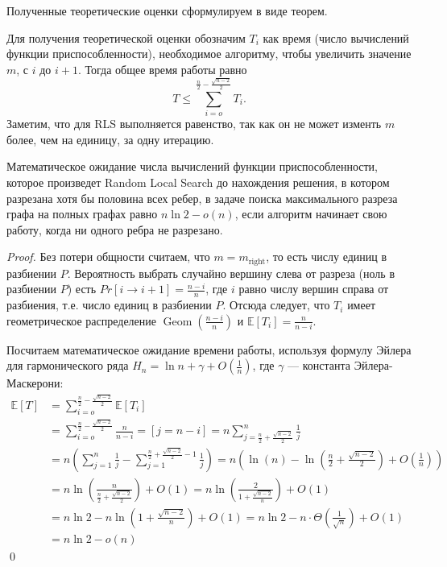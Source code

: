 \documentclass[times]{itmo-student-thesis}
\DeclareMathOperator{\Geom}{Geom}
\begin{document}
Полученные теоретические оценки сформулируем в виде теорем.


Для получения теоретической оценки обозначим $T_i$ как время (число вычислений функции приспособленности), необходимое алгоритму, чтобы увеличить значение $m$, с $i$ до $i + 1$.
Тогда общее время работы равно
$$
  T \le \sum_{i=o}^{\frac{n}{2} - \frac{\sqrt{n-2}}{2}} T_i.
$$
Заметим, что для RLS выполняется равенство, так как он не может изменть $m$ более, чем на единицу, за одну итерацию.

\begin{theorem} \label{thm:rls}
  Математическое ожидание числа вычислений функции приспособленности, которое произведет Random Local Search до нахождения решения, в котором разрезана хотя бы половина всех ребер, в задаче поиска максимального разреза графа на полных графах равно $n\ln 2 - o(n)$, если алгоритм начинает свою работу, когда ни одного ребра не разрезано.
\end{theorem}

\begin{proof}
  Без потери общности считаем, что $m = m_{\text{right}}$, то есть числу единиц в разбиении $P$.
  Вероятность выбрать случайно вершину слева от разреза (ноль в разбиении $P$) есть $Pr[i \rightarrow i + 1] = \frac{n-i}{n}$, где $i$ равно числу вершин справа от разбиения, т.е. число единиц в разбиении $P$.
  Отсюда следует, что  $T_i$ имеет геометрическое распределение $\Geom(\frac{n-i}{n})$ и $\mathbb{E}[T_i] = \frac{n}{n-i}$.

  Посчитаем математическое ожидание времени работы, используя формулу Эйлера для гармонического ряда $H_n = \ln n + \gamma + O(\frac{1}{n})$, где $\gamma$ --- константа Эйлера-Маскерони:
  \begin{align*}
      \mathbb{E}[T] &=
                  \sum_{i=o}^{\frac{n}{2} - \frac{\sqrt{n-2}}{2}} \mathbb{E}[T_i] \\
          &=
                  \sum_{i=o}^{\frac{n}{2} - \frac{\sqrt{n-2}}{2}} \frac{n}{n-i} = [j = n - i] = n \sum_{j=\frac{n}{2} + \frac{\sqrt{n-2}}{2}}^{n} \frac{1}{j}  \\
          &=      n \left(\sum_{j=1}^{n}\frac{1}{j} - \sum_{j=1}^{\frac{n}{2} +  \frac{\sqrt{n-2}}{2} - 1} \frac{1}{j} \right) =
                  n\left(\ln(n) - \ln\left(\frac{n}{2} + \frac{\sqrt{n-2}}{2}\right) + O\left(\frac{1}{n}\right) \right) \\
          &=
                  n \ln\left(\frac{n}{\frac{n}{2} + \frac{\sqrt{n-2}}{2}}\right) + O(1) = n \ln\left(\frac{2}{1 + \frac{\sqrt{n-2}}{n}}\right) + O(1) \\
          &= n\ln2 - n\ln\left(1 + \frac{\sqrt{n-2}}{n}\right) + O(1) = n\ln2 - n\cdot\Theta\left(\frac{1}{\sqrt{n}}\right) + O(1) \\
          &= n\ln2 - o(n)
  \end{align*}
  \qed
\end{proof}
\end{document}
